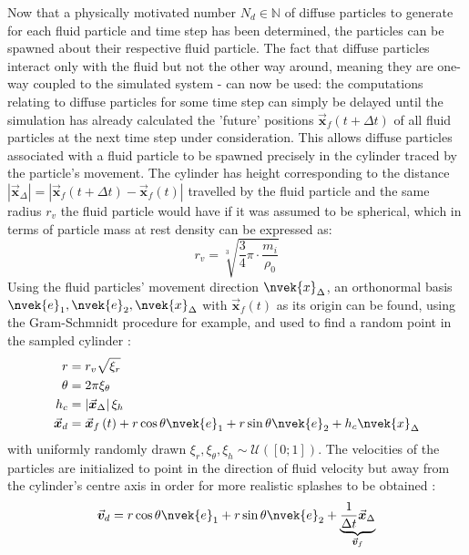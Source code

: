 \documentclass[oneside, a4paper]{book}
\newcommand\abs[1]{\left|#1\right|}
\newcommand\vek[1]{\vec{\bm{#1}}}
\newcommand\br[1]{\left(#1\right)}
\begin{document}
  Now that a physically motivated number $N_d\in\mathds{N}$ of diffuse particles to generate for each fluid particle and time step has been determined, the particles can be spawned about their respective fluid particle. The fact that diffuse particles interact only with the fluid but not the other way around, meaning they are one-way coupled to the simulated system - can now be used: the computations relating to diffuse particles for some time step can simply be delayed until the simulation has already calculated the 'future' positions $\vek{x}_f\br{t+\Delta t}$ of all fluid particles at the next time step under consideration. This allows diffuse particles associated with a fluid particle to be spawned precisely in the cylinder traced by the particle's movement. The cylinder has height corresponding to the distance $\abs{\vek{x}_\Delta} = \abs{\vek{x}_f\br{t+\Delta t}-\vek{x}_f\br{t}}$ travelled by the fluid particle and the same radius $r_v$ the fluid particle would have \autocite{spray-foam-bubbles} if it was assumed to be spherical, which in terms of particle mass at rest density can be expressed as:
  \begin{equation}
    r_v = \sqrt[3]{\frac{3}{4}\pi \cdot \frac{m_i}{\rho_0}}
  \end{equation}
  Using the fluid particles' movement direction $\nvek{x}_\Delta$, an orthonormal basis $\nvek{e}_1, \nvek{e}_2, \nvek{x}_\Delta$ with $\vek{x}_f\br{t}$ as its origin can be found, using the Gram-Schmnidt procedure for example, and used to find a random point in the sampled cylinder \autocite{spray-foam-bubbles}:
  \begin{align}
    r &= r_v\sqrt{\xi_r}\\
    \theta &= 2\pi \xi_\theta\\
    h_{c} &= \abs{\vek{x}_\Delta}\xi_h\\
    \vek{x}_d &= \vek{x}_f\br{t} + r\cos\theta \nvek{e}_1 + r\sin\theta\nvek{e}_2 + h_{c} \nvek{x}_\Delta
  \end{align}
  with uniformly randomly drawn $\xi_r, \xi_\theta, \xi_h \sim \mathcal{U}\br{[0;1]}$. The velocities of the particles are initialized to point in the direction of fluid velocity but away from the cylinder's centre axis in order for more realistic splashes to be obtained \autocite{spray-foam-bubbles}:
  \begin{equation}
    \vek{v}_d = r\cos\theta \nvek{e}_1 + r\sin\theta\nvek{e}_2 + \underbrace{\frac{1}{\Delta t}\vek{x}_\Delta}_{\vek{v}_f}
  \end{equation}
\end{document}
